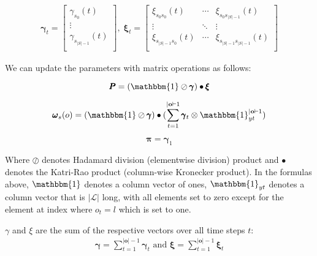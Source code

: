 \begin{align}
\pmb{\gamma}_t = 
    \begin{bmatrix}
        \gamma_{s_0}(t)       \\
        \vdots                \\
        \gamma_{s_{|S|-1}}(t) \\
    \end{bmatrix}, \;
\pmb{\xi}_t = 
    \begin{bmatrix}
        \xi_{s_0 s_0}(t)      & \cdots & \xi_{s_0 s_{|S|-1}}(t)      \\
        \vdots                & \ddots & \vdots                      \\
        \xi_{s_{|S|-1}s_0}(t) & \cdots & \xi_{s_{|S|-1}s_{|S|-1}}(t) \\
    \end{bmatrix}
\end{align}

We can update the parameters with matrix operations as follows:

\begin{equation}
\pmb{P}
    = (\mathbbm{1} \oslash \pmb{\gamma}) \bullet \pmb{\xi}
    \label{eq:transition-probabilities-update}
\end{equation}

\begin{equation}
\pmb{\omega}
    _s(o) = (\mathbbm{1} \oslash \pmb{\gamma}) \bullet (\sum_{t=1}^{|\mathbf{o}|-1} \pmb{\gamma}_t \otimes \mathbbm{1}_{yt}^{|\mathbf{o}|-1})
    \label{eq:omega-update}
\end{equation}

\begin{equation}
\pmb{\pi}
    = \pmb{\gamma}_1
    \label{eq:initial-probabilities-update}
\end{equation}

Where $\oslash$ denotes Hadamard division (elementwise division) product and $\bullet$ denotes the Katri-Rao product (column-wise Kronecker product).
In the formulas above, $\mathbbm{1}$ denotes a column vector of ones, $\mathbbm{1}_{yt}$ denotes a column vector that is $|\mathcal{L}|$ long, with all elements set to zero except for the element at index where $o_t = l$ which is set to one.

$\gamma$ and $\xi$ are the sum of the respective vectors over all time steps $t$:
\begin{align}
    \pmb{\gamma} = \sum_{t=1}^{|\mathbf{o}|-1} \pmb{\gamma}_t 
    \text{ and } 
    \pmb{\xi} = \sum_{t=1}^{|\mathbf{o}|-1} \pmb{\xi}_t
\end{align} 

